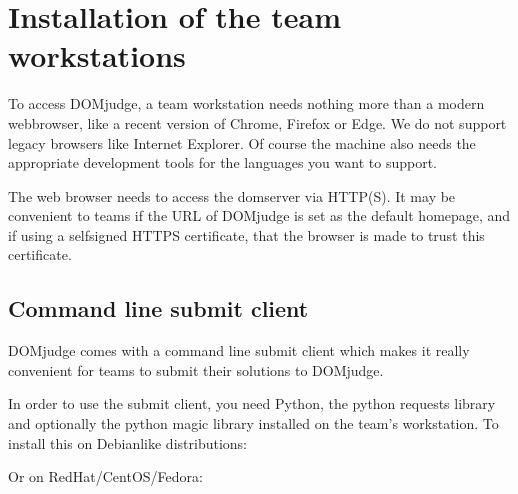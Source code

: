 \documentclass[a4paper,10pt,english,openany]{sphinxmanual}
\begin{document}
\sphinxstepscope


\section{Installation of the team workstations}
\label{\detokenize{install-workstation:installation-of-the-team-workstations}}\label{\detokenize{install-workstation::doc}}
\sphinxAtStartPar
To access DOMjudge, a team workstation needs nothing more than a modern
webbrowser, like a recent version of Chrome, Firefox or Edge. We do not
support legacy browsers like Internet Explorer. Of course the machine
also needs the appropriate development tools for the languages you want
to support.

\sphinxAtStartPar
The web browser needs to access the domserver via HTTP(S). It may be
convenient to teams if the URL of DOMjudge is set as the default homepage,
and if using a self\sphinxhyphen{}signed HTTPS certificate, that the browser is made
to trust this certificate.


\subsection{Command line submit client}
\label{\detokenize{install-workstation:command-line-submit-client}}\label{\detokenize{install-workstation:submit-client-requirements}}
\sphinxAtStartPar
DOMjudge comes with a command line submit client which makes it really
convenient for teams to submit their solutions to DOMjudge.

\sphinxAtStartPar
In order to use the submit client, you need Python, the python requests
library and optionally the python magic library installed on the team’s
workstation. To install this on Debian\sphinxhyphen{}like distributions:

\begin{sphinxVerbatim}[commandchars=\\\{\}]
     
\end{sphinxVerbatim}

\sphinxAtStartPar
Or on RedHat/CentOS/Fedora:

\begin{sphinxVerbatim}[commandchars=\\\{\}]
     
\end{sphinxVerbatim}
\end{document}
